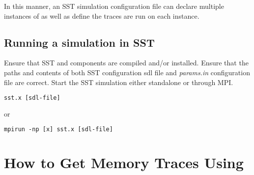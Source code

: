 In this manner, an SST simulation configuration file can declare multiple
instances of \SIM as well as define the traces are run on each \SIM instance.

\subsection{Running a \SIM simulation in SST}

Ensure that SST and \SIM components are compiled and/or installed.  
Ensure that the paths and contents of both SST configuration sdl file and
\SIM \textit{params.in} configuration file are correct. Start the SST simulation 
either standalone or through MPI.

\begin{Verbatim}
sst.x [sdl-file]
\end{Verbatim}
or
\begin{Verbatim}
mpirun -np [x] sst.x [sdl-file]
\end{Verbatim}



\section{How to Get Memory Traces Using \SIM}











